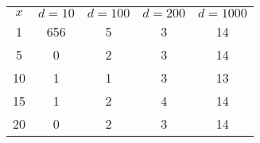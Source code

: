 \begin{tabular}{ccccc}
\hline
 $x$ & $d=10$ & $d=100$ & $d=200$ & $d=1000$ \\
 1 &656 &5 &3 &14\\
 5 &0 &2 &3 &14\\
10 &1 &1 &3 &13\\
15 &1 &2 &4 &14\\
20 &0 &2 &3 &14\\
\hline
\end{tabular}
